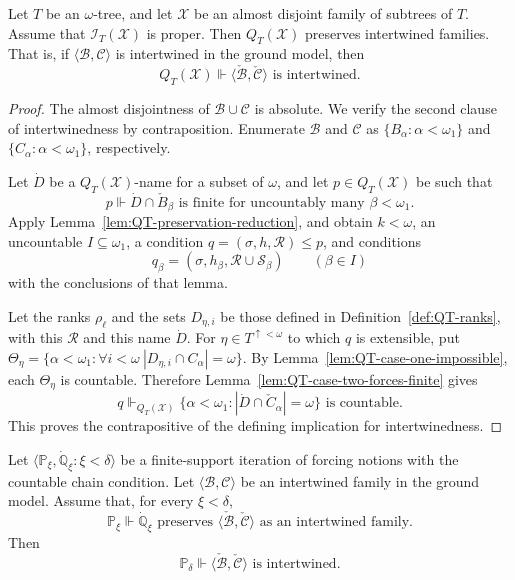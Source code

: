 \begin{lemma}\label{lem:tree-preserves-intertwined}
Let $T$ be an $\omega$-tree, and let $\mathcal X$ be an
almost disjoint family of subtrees of $T$.
Assume that $\mathcal I_T(\mathcal X)$ is proper.
Then $Q_T(\mathcal X)$ preserves intertwined families.
That is, if $\langle\mathcal B,\mathcal C\rangle$
is intertwined in the ground model, then
\[
  Q_T(\mathcal X)\Vdash
  \langle\check{\mathcal B},\check{\mathcal C}\rangle\text{ is intertwined}.
\]
\end{lemma}


\begin{proof}
The almost disjointness of $\mathcal B\cup\mathcal C$ is absolute.
We verify the second clause of intertwinedness by contraposition.
Enumerate $\mathcal B$ and $\mathcal C$ as $\{B_\alpha:\alpha<\omega_1\}$ and $\{C_\alpha:\alpha<\omega_1\}$, respectively.

Let $\dot D$ be a $Q_T(\mathcal X)$-name for a subset of $\omega$, and let
$p\in Q_T(\mathcal X)$ be such that
\[
  p \Vdash \dot D\cap \check B_\beta\text{ is finite for uncountably many }\beta<\omega_1.
\]
Apply Lemma~\ref{lem:QT-preservation-reduction}, and obtain
$k<\omega$, an uncountable $I\subseteq\omega_1$, a condition
$q=(\sigma,h,\mathcal R)\leq p$, and conditions
\[
  q_\beta=(\sigma,h_\beta,\mathcal R\cup\mathcal S_\beta)
  \qquad(\beta\in I)
\]
with the conclusions of that lemma.

Let the ranks $\rho_\ell$ and the sets $D_{\eta,i}$ be those defined in
Definition~\ref{def:QT-ranks}, with this $\mathcal R$ and this name $\dot D$.
For $\eta\in T^{\uparrow<\omega}$ to which $q$ is extensible, put $\Theta_\eta=
  \{\alpha<\omega_1:
    \forall i<\omega\ |D_{\eta,i}\cap C_\alpha|=\omega\}$.
By Lemma~\ref{lem:QT-case-one-impossible}, each $\Theta_\eta$ is countable.
Therefore Lemma~\ref{lem:QT-case-two-forces-finite} gives
\[
  q\Vdash_{Q_T(\mathcal X)}
  \{\alpha<\omega_1:|\dot D\cap \check C_\alpha|=\omega\}\text{ is countable}.
\]
This proves the contrapositive of the defining implication for intertwinedness.
\end{proof}


\begin{lemma}\label{lem:fs-iteration-preserves-intertwined}
Let $\langle\mathbb P_\xi,\dot{\mathbb Q}_\xi:\xi<\delta\rangle$
be a finite-support iteration of forcing notions with the countable chain condition.
Let $\langle\mathcal B,\mathcal C\rangle$ be an intertwined family in the ground
model.  Assume that, for every $\xi<\delta$,
\[
  \mathbb P_\xi\Vdash
  \dot{\mathbb Q}_\xi\text{ preserves }
  \langle\check{\mathcal B},\check{\mathcal C}\rangle
  \text{ as an intertwined family}.
\]
Then
\[
  \mathbb P_\delta\Vdash
  \langle\check{\mathcal B},\check{\mathcal C}\rangle
  \text{ is intertwined}.
\]
\end{lemma}

